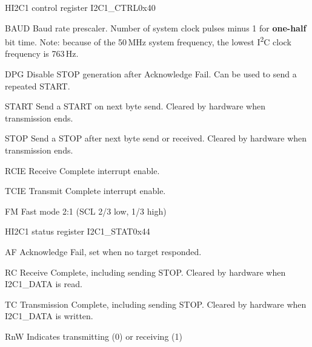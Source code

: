 \documentclass[12pt]{article}
\begin{document}
\begin{register}{H}{I2C1 control register I2C1\_CTRL}{0x40}
\label{i2c1ctrl}
%
%
%
%
%
%
%
%
%
\regnewline%
\end{register}
\begin{regdesc}[0.8\textwidth]\begin{reglist}[0000000i]
\item [BAUD] Baud rate prescaler. Number of system clock pulses minus 1 for \textbf{one-half} bit time.
Note: because of the 50\,MHz system frequency, the lowest I\textsuperscript{2}C clock frequency is 763\,Hz.
\item [DPG] Disable STOP generation after Acknowledge Fail. Can be used to send a repeated START.
\item [START] Send a START on next byte send. Cleared by hardware when transmission ends.
\item [STOP] Send a STOP after next byte send or received. Cleared by hardware when transmission ends.
\item [RCIE] Receive Complete interrupt enable.
\item [TCIE] Transmit Complete interrupt enable.
\item [FM] Fast mode 2:1 (SCL 2/3 low, 1/3 high)
\end{reglist}\end{regdesc}

\begin{register}{H}{I2C1 status register I2C1\_STAT}{0x44}
\label{i2c1stat}
%
%
%
%
%
\regnewline%
\end{register}
\begin{regdesc}[0.8\textwidth]\begin{reglist}[0000000i]
\item [AF] Acknowledge Fail, set when no target responded.
\item [RC] Receive Complete, including sending STOP. Cleared by hardware when I2C1\_DATA is read.
\item [TC] Transmission Complete, including sending STOP. Cleared by hardware when I2C1\_DATA is written.
\item [RnW] Indicates transmitting (0) or receiving (1)
\end{reglist}\end{regdesc}
\end{document}
